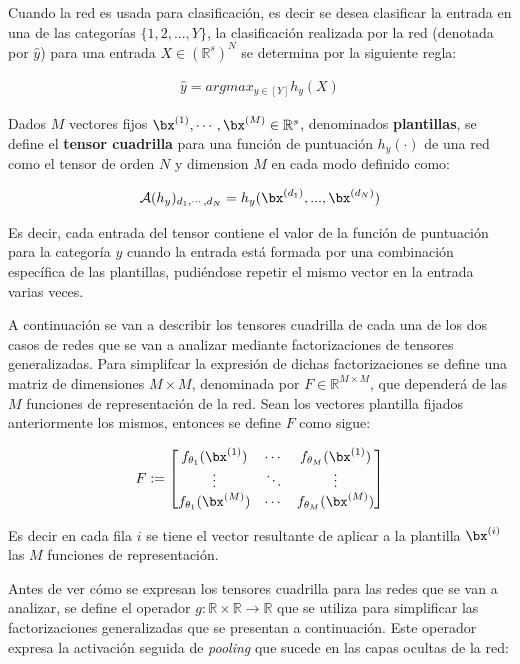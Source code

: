 Cuando la red es usada para clasificación, es decir se desea clasificar la entrada en una de las categorías $\{1,2,... ,Y\}$, la clasificación realizada por la red (denotada por $\hat{y}$) para una entrada $X\in(\mathbb{R}^s)^N$ se determina por la siguiente regla:

\begin{align*}
\hat{y}=argmax_{y\in[Y]}h_y(X)
\end{align*}

Dados $M$ vectores fijos $\bx^{(1)},\cdots ,\bx^{(M)}\in\mathbb{R}^s$, denominados \textbf{plantillas}, se define el \textbf{tensor cuadrilla} para una función de puntuación $h_y(\cdot)$ de una red como el tensor de orden $N$ y dimension $M$ en cada modo definido como: 

\begin{equation}
\mathcal{A}(h_y)_{d_1,\cdots ,d_N} = h_y(\bx^{(d_1)},... ,\bx^{(d_N)})
\end{equation}

Es decir, cada entrada del tensor contiene el valor de la función de puntuación para la categoría $y$ cuando la entrada está formada por una combinación específica de las plantillas, pudiéndose repetir el mismo vector en la entrada varias veces.
	
A continuación se van a describir los tensores cuadrilla de cada una de los dos casos de redes que se van a analizar mediante factorizaciones de tensores generalizadas. Para simplifcar la expresión de dichas factorizaciones se define una matriz de dimensiones $M\times M$, denominada por $F \in \mathbb{R}^{M\times M}$, que dependerá de las $M$ funciones de representación de la red. Sean los vectores plantilla fijados anteriormente los mismos, entonces se define $F$ como sigue:


\begin{equation} \label{ec:mf}	
F:=\begin{bmatrix}
f_{\theta_1}(\bx^{(1)}) & \cdots  & f_{\theta_M}(\bx^{(1)})\\
\vdots & \ddots & \vdots\\
f_{\theta_1}(\bx^{(M)}) & \cdots  & f_{\theta_M}(\bx^{(M)})\\
\end{bmatrix}
\end{equation}

Es decir en cada fila $i$ se tiene el vector resultante de aplicar a la plantilla $\bx^{(i)}$ las $M$ funciones de representación.

Antes de ver cómo se expresan los tensores cuadrilla para las redes que se van a analizar, se define el operador $g:\mathbb{R} \times \mathbb{R} \rightarrow\mathbb{R}$ que se utiliza para simplificar las factorizaciones generalizadas que se presentan a continuación. Este operador expresa la activación seguida de \textit{pooling} que sucede en las capas ocultas de la red:

